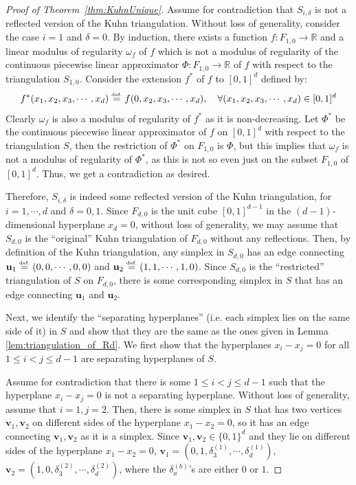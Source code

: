 \documentclass{article}
\numberwithin{equation}{section}
\theoremstyle{definition}
\newcommand{\eqdef}{\ensuremath{\stackrel{\mbox{\upshape\tiny def.}}{=}}}
\begin{document}
\begin{proof}[{Proof of Theorem~\ref{thm:KuhnUnique}}]
Assume for contradiction that $S_{i,\delta}$ is not a reflected version of the Kuhn triangulation. Without loss of generality, consider the case $i=1$ and $\delta=0$. By induction, there exists a function $f:F_{1,0}\rightarrow\mathbb{R}$ and a linear modulus of regularity $\omega_f$ of $f$ which is not a modulus of regularity of the continuous piecewise linear approximator $\Phi:F_{1,0}\rightarrow\mathbb{R}$ of $f$ with respect to the triangulation $S_{1,0}$. Consider the extension $f^{\ast}$ of $f$ to $[0,1]^d$ defined by:
$$f^{\ast}(x_1,x_2,x_3,\cdots,x_d)  \eqdef  f(0,x_2,x_3,\cdots,x_d), \quad
\forall (x_1,x_2,x_3,\cdots,x_d)\in [0,1]^d$$
Clearly $\omega_f$ is also a modulus of regularity of $f^{\ast}$ as it is non-decreasing. Let $\Phi^{\ast}$ be the continuous piecewise linear approximator of $f$ on $[0,1]^d$ with respect to the triangulation $S$, then the restriction of $\Phi^{\ast}$ on $F_{1,0}$ is $\Phi$, but this implies that $\omega_f$ is not a modulus of regularity of $\Phi^{\ast}$, as this is not so even just on the subset $F_{1,0}$ of $[0,1]^d$. Thus, we get a contradiction as desired.

Therefore, $S_{i,\delta}$ is indeed some reflected version of the Kuhn triangulation, for $i=1,\cdots,d$ and $\delta=0,1$. Since $F_{d,0}$ is the unit cube $[0,1]^{d-1}$ in the $(d-1)$-dimensional hyperplane $x_d=0$, without loss of generality, we may assume that $S_{d,0}$ is the ``original'' Kuhn triangulation of $F_{d,0}$ without any reflections. Then, by definition of the Kuhn triangulation, any simplex in $S_{d,0}$ has an edge connecting $\mathbf{u}_1  \eqdef  (0,0,\cdots,0,0)$ and $\mathbf{u}_2  \eqdef  (1,1,\cdots,1,0)$. Since $S_{d,0}$ is the ``restricted'' triangulation of $S$ on $F_{d,0}$, there is some corresponding simplex in $S$ that has an edge connecting $\mathbf{u}_1$ and $\mathbf{u}_2$. 

Next, we identify the ``separating hyperplanes'' (i.e. each simplex lies on the same side of it) in $S$ and show that they are the same as the ones given in Lemma \ref{lem:triangulation_of_Rd}. We first show that the hyperplanes $x_i-x_j=0$ for all $1 \le i<j \le d-1$ are separating hyperplanes of $S$. 

Assume for contradiction that there is some $1 \le i<j \le d-1$ such that the hyperplane $x_i-x_j=0$ is not a separating hyperplane. Without loss of generality, assume that $i=1,j=2$. Then, there is some simplex in $S$ that has two vertices $\mathbf{v}_1,\mathbf{v}_2$ on different sides of the hyperplane $x_1-x_2=0$, so it has an edge connecting $\mathbf{v}_1,\mathbf{v}_2$ as it is a simplex. Since $\mathbf{v}_1,\mathbf{v}_2\in\{0,1\}^d$ and they lie on different sides of the hyperplane $x_1-x_2=0$, $\mathbf{v}_1 = (0,1,\delta_3^{(1)},\cdots,\delta_d^{(1)})$, $\mathbf{v}_2 = (1,0,\delta_3^{(2)},\cdots,\delta_d^{(2)})$, where the $\delta_a^{(b)}$'s are either $0$ or $1$.


\end{proof}
\end{document}
